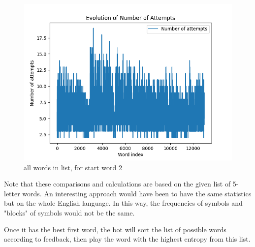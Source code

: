 \begin{figure}[!h]
\centering
\includegraphics[scale=0.7]{images/start2-total.png}
\caption{all words in list, for start word 2}
\label{total}
\end{figure}

Note that these comparisons and calculations are based on the given list of 5-letter words. An interesting approach would have been to have the same statistics but on the whole English language. In this way, the frequencies of symbols and "blocks" of symbols would not be the same.

Once it has the best first word, the bot will sort the list of possible words according to feedback, then play the word with the highest entropy from this list. 